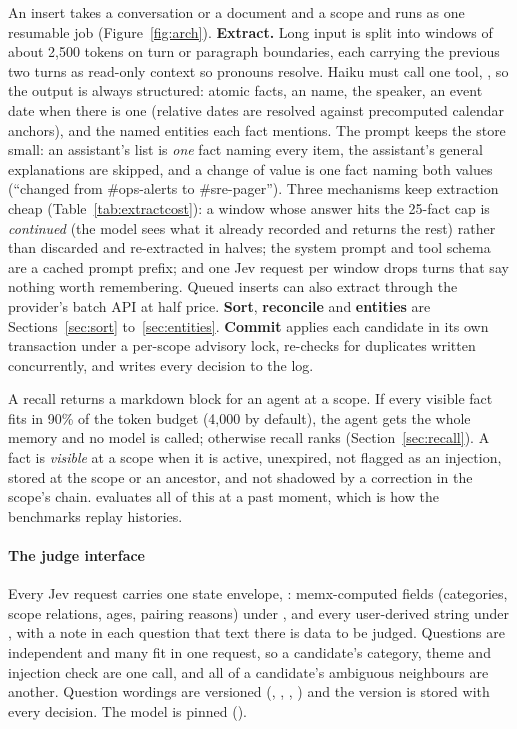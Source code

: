 An insert takes a conversation or a document and a scope and runs as one resumable job (Figure~\ref{fig:arch}).
\textbf{Extract.} Long input is split into windows of about 2,500 tokens on turn or paragraph boundaries, each carrying
the previous two turns as read-only context so pronouns resolve. Haiku must call one tool, , so the
output is always structured: atomic facts, an  name, the speaker, an event date when there is one
(relative dates are resolved against precomputed calendar anchors), and the named entities each fact mentions. The
prompt keeps the store small: an assistant's list is \emph{one} fact naming every item, the assistant's general
explanations are skipped, and a change of value is one fact naming both values (``changed from \#ops-alerts to
\#sre-pager''). Three mechanisms keep extraction cheap (Table~\ref{tab:extractcost}): a window whose answer hits the
25-fact cap is \emph{continued} (the model sees what it already recorded and returns the rest) rather than discarded and
re-extracted in halves; the system prompt and tool schema are a cached prompt prefix; and one Jev request per window
drops turns that say nothing worth remembering. Queued inserts can also extract through the provider's batch API at
half price. \textbf{Sort}, \textbf{reconcile} and \textbf{entities} are Sections~\ref{sec:sort}
to~\ref{sec:entities}. \textbf{Commit} applies each candidate in its own transaction under a per-scope advisory lock,
re-checks for duplicates written concurrently, and writes every decision to the log.

A recall returns a markdown block for an agent at a scope. If every visible fact fits in 90\% of the token budget (4,000
by default), the agent gets the whole memory and no model is called; otherwise recall ranks (Section~\ref{sec:recall}).
A fact is \emph{visible} at a scope when it is active, unexpired, not flagged as an injection, stored at the scope or an
ancestor, and not shadowed by a correction in the scope's chain.  evaluates all of this at a past moment,
which is how the benchmarks replay histories.

\paragraph{The judge interface} Every Jev request carries one state envelope,
: memx-computed fields (categories, scope relations, ages,
pairing reasons) under , and every user-derived string under , with a note in each
question that text there is data to be judged. Questions are independent and many fit in one request, so a candidate's
category, theme and injection check are one call, and all of a candidate's ambiguous neighbours are another. Question
wordings are versioned (, , , ) and the version is stored
with every decision. The model is pinned ().

